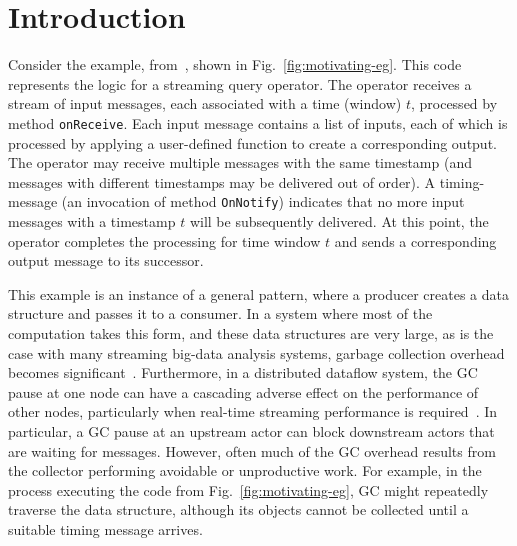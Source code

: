\newcommand{\TODO}[1]{\textbf{TODO: #1}} \newcommand{\eg}{\emph{e.g.}}
\newcommand{\ie}{\emph{i.e.}}

\section{Introduction} \label{sec:introduction}

Consider the example, from~\cite{Broom:HotOS}, shown in
Fig.~\ref{fig:motivating-eg}.  This code represents the logic for a
streaming query operator.  The operator receives a stream of input
messages, each associated with a time (window) $t$, processed by
method \texttt{onReceive}.  Each input message contains a list of
inputs, each of which is processed by applying a user-defined function
to create a corresponding output.  The operator may receive multiple
messages with the same timestamp (and messages with different
timestamps may be delivered out of order).  A timing-message (an
invocation of method \texttt{OnNotify}) indicates that no more input
messages with a timestamp $t$ will be subsequently delivered.  At this
point, the operator completes the processing for time window $t$ and
sends a corresponding output message to its successor.



This example is an instance of a general pattern, where a producer creates a
data structure and passes it to a consumer. In a system where most of the
computation takes this form, and these data structures are very large, as is
the case with many streaming big-data analysis systems, garbage collection
overhead becomes significant~\cite{Broom:HotOS,Nguyen+:facade}.  Furthermore, in a
distributed dataflow system, the GC pause at one node can have a cascading
adverse effect on the performance of other nodes, particularly when real-time
streaming performance is required~\cite{Broom:HotOS, harris15}.  In
particular, a GC pause at an upstream actor can block downstream actors that
are waiting for messages.  However, often much of the GC overhead results
from the collector performing avoidable or unproductive work.  For example,
in the process executing the code from Fig.~\ref{fig:motivating-eg}, GC might
repeatedly traverse the  data structure, although its objects cannot
be collected until a suitable timing message arrives.


